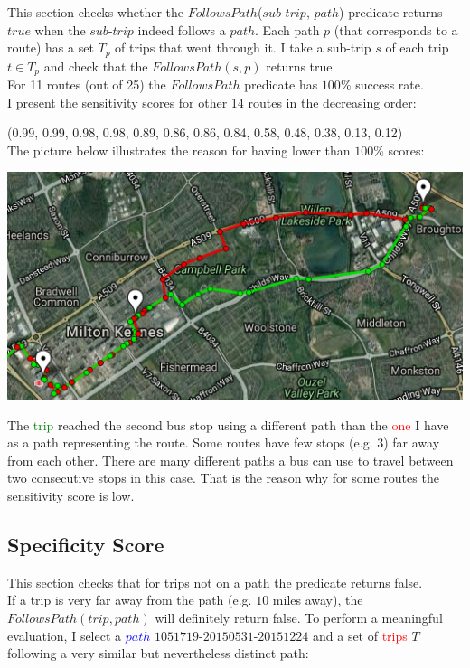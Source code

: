 \documentclass[12pt,a4paper,oneside,openright]{report}
\begin{document}
This section checks whether the $FollowsPath$($sub$-$trip$, $path$) predicate returns $true$
when the $sub$-$trip$ indeed follows a $path$. Each path $p$ (that corresponds to a route)
has a set $T_p$ of trips that went through it. I take a sub-trip $s$ of each trip $t \in T_p$
and check that the $FollowsPath(s, p)$ returns true. \\

For 11 routes (out of 25) the $FollowsPath$ predicate has $100\%$ success rate. \\

I present the sensitivity scores for other 14 routes in the decreasing order:

(0.99, 0.99, 0.98, 0.98, 0.89, 0.86, 0.86, 0.84, 0.58, 0.48, 0.38, 0.13, 0.12) \\

The picture below illustrates the reason for having lower than $100\%$ scores:

\includegraphics[width=\textwidth]{figs/same_route_wrong_path.png}

The \textcolor{green}{trip} reached the second bus stop using a different path
than the \textcolor{red}{one} I have as a path representing the route.
Some routes have few stops (e.g. 3) far away from each other.
There are many different paths a bus can use to travel
between two consecutive stops in this case. That is the reason why for some routes the
sensitivity score is low.

\subsection{Specificity Score}

This section checks that for trips not on a path the predicate returns false. \\

If a trip is very far away from the path (e.g. $10$ miles away), the
$FollowsPath(trip, path)$ will definitely return false. To perform
a meaningful evaluation, I select a \textcolor{blue}{$path$}
$1051719$-$20150531$-$20151224$ and a set of \textcolor{red}{trips}
$T$ following a very similar but nevertheless distinct path: \\
\end{document}
